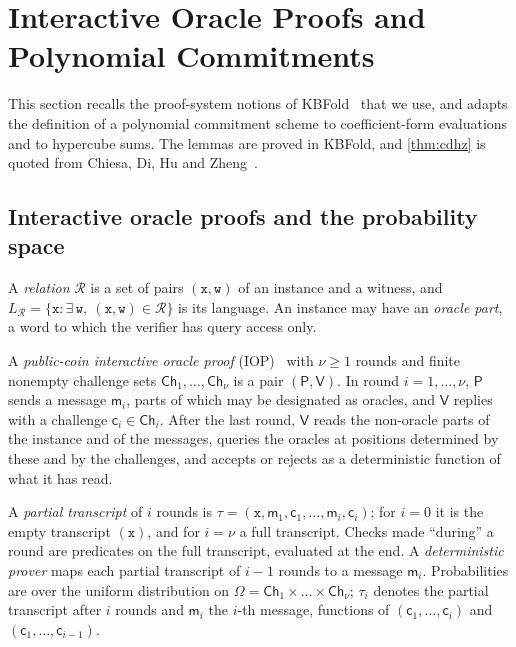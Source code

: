 \section{Interactive Oracle Proofs and Polynomial Commitments}\label{sec:proofs}

This section recalls the proof-system notions of KBFold~\cite[\S3]{Mkh26} that we use, and adapts the definition of a polynomial commitment scheme to coefficient-form evaluations and to hypercube sums.
The lemmas are proved in KBFold, and \cref{thm:cdhz} is quoted from Chiesa, Di, Hu and Zheng~\cite{CDHZ25}.

\subsection{Interactive oracle proofs and the probability space}\label{sec:proofs:iop}

A \emph{relation} $\mathcal{R}$ is a set of pairs $(\mathtt{x},\mathtt{w})$ of an instance and a witness, and $L_{\mathcal{R}} = \{\mathtt{x} : \exists\,\mathtt{w},\ (\mathtt{x},\mathtt{w}) \in \mathcal{R}\}$ is its language.
An instance may have an \emph{oracle part}, a word to which the verifier has query access only.

\begin{definition}\label{def:iop}
A \emph{public-coin interactive oracle proof} (IOP)~\cite{BCS16} with $\nu \ge 1$ rounds and finite nonempty challenge sets $\mathsf{Ch}_1,\dots,\mathsf{Ch}_\nu$ is a pair $(\mathsf{P},\mathsf{V})$.
In round $i = 1,\dots,\nu$, $\mathsf{P}$ sends a message $\mathsf{m}_i$, parts of which may be designated as oracles, and $\mathsf{V}$ replies with a challenge $\mathsf{c}_i \in \mathsf{Ch}_i$.
After the last round, $\mathsf{V}$ reads the non-oracle parts of the instance and of the messages, queries the oracles at positions determined by these and by the challenges, and accepts or rejects as a deterministic function of what it has read.
\end{definition}

A \emph{partial transcript} of $i$ rounds is $\tau = (\mathtt{x}, \mathsf{m}_1,\mathsf{c}_1,\dots,\mathsf{m}_i,\mathsf{c}_i)$; for $i = 0$ it is the empty transcript $(\mathtt{x})$, and for $i = \nu$ a full transcript.
Checks made ``during'' a round are predicates on the full transcript, evaluated at the end.
A \emph{deterministic prover} maps each partial transcript of $i-1$ rounds to a message $\mathsf{m}_i$.
Probabilities are over the uniform distribution on $\Omega = \mathsf{Ch}_1 \times \dots \times \mathsf{Ch}_\nu$; $\tau_i$ denotes the partial transcript after $i$ rounds and $\mathsf{m}_i$ the $i$-th message, functions of $(\mathsf{c}_1,\dots,\mathsf{c}_i)$ and $(\mathsf{c}_1,\dots,\mathsf{c}_{i-1})$.

